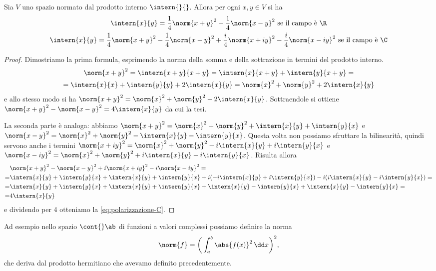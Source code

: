 \begin{proprieta} \label{p:formule-polarizzazione}
	Sia $V$ uno spazio normato dal prodotto interno $\intern{}{}$.
	Allora per ogni $x,y\in V$ si ha
	\begin{gather}
		\intern{x}{y}=\frac14\norm{x+y}^2-\frac14\norm{x-y}^2\text{ se il campo è }\R
		\label{eq:polarizzazione-R}\\
		\intern{x}{y}=\frac14\norm{x+y}^2-\frac14\norm{x-y}^2+\frac{i}4\norm{x+iy}^2-\frac{i}4\norm{x-iy}^2\text{ se il campo è }\C
		\label{eq:polarizzazione-C}
	\end{gather}
\end{proprieta}
\begin{proof}
	Dimostriamo la prima formula, esprimendo la norma della somma e della sottrazione in termini del prodotto interno.
	\begin{multline*}
		\norm{x+y}^2=\intern{x+y}{x+y}=\intern{x}{x+y}+\intern{y}{x+y}=\\
		=\intern{x}{x}+\intern{y}{y}+2\intern{x}{y}=\norm{x}^2+\norm{y}^2+2\intern{x}{y}
	\end{multline*}
	e allo stesso modo si ha $\norm{x+y}^2=\norm{x}^2+\norm{y}^2-2\intern{x}{y}$.
	Sottraendole si ottiene $\norm{x+y}^2-\norm{x-y}^2=4\intern{x}{y}$ da cui la tesi.

	La seconda parte è analoga: abbiamo $\norm{x+y}^2=\norm{x}^2+\norm{y}^2+\intern{x}{y}+\intern{y}{x}$ e $\norm{x-y}^2=\norm{x}^2+\norm{y}^2-\intern{x}{y}-\intern{y}{x}$.
	Questa volta non possiamo sfruttare la bilinearità, quindi servono anche i termini $\norm{x+iy}^2=\norm{x}^2+\norm{y}^2-i\intern{x}{y}+i\intern{y}{x}$ e $\norm{x-iy}^2=\norm{x}^2+\norm{y}^2+i\intern{x}{y}-i\intern{y}{x}$.
	Risulta allora
	\begin{equation}
		\begin{aligned}
			&\norm{x+y}^2-\norm{x-y}^2+i\norm{x+iy}^2-i\norm{x-iy}^2=\\
			=&\intern{x}{y}+\intern{y}{x}+\intern{x}{y}+\intern{y}{x}+i(-i\intern{x}{y}+i\intern{y}{x})-i(i\intern{x}{y}-i\intern{y}{x})=\\
			=&\intern{x}{y}+\intern{y}{x}+\intern{x}{y}+\intern{y}{x}+\intern{x}{y}-\intern{y}{x}+\intern{x}{y}-\intern{y}{x}=\\
			=&4\intern{x}{y}
		\end{aligned}
	\end{equation}
	e dividendo per 4 otteniamo la \eqref{eq:polarizzazione-C}.
\end{proof}
Ad esempio nello spazio $\cont{}\ab$ di funzioni a valori complessi possiamo definire la norma
\begin{equation*}
	\norm{f}=\bigg(\int_a^b\abs{f(x)}^2\,\dd x\bigg)^2,
\end{equation*}
che deriva dal prodotto hermitiano che avevamo definito precedentemente.


